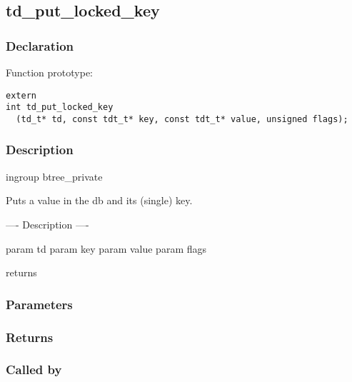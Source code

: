 
\newpage
\subsection{td\_put\_locked\_key}
\subsubsection{Declaration} Function prototype:

\begin{verbatim}
extern
int td_put_locked_key
  (td_t* td, const tdt_t* key, const tdt_t* value, unsigned flags);
\end{verbatim}

\subsubsection{Description}


 ingroup btree\_private

 Puts a value in the db and its (single) key.
 
 ---- Description ----

 param td
 param key
 param value
 param flags

 returns
 

\subsubsection{Parameters}
\subsubsection{Returns}
\subsubsection{Called by}
